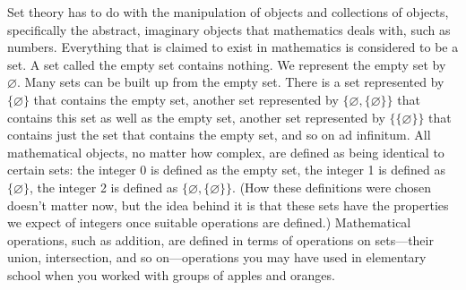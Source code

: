 Set theory has to do with the manipulation of objects and
collections of objects, specifically the abstract, imaginary objects that
mathematics deals with, such as numbers. Everything that is claimed to exist
in mathematics is considered to be a set.  A set called the empty
set contains nothing.  We represent the empty set by
$\varnothing$.  Many sets can be built up from the empty set.  There is a set
represented by $\{\varnothing\}$ that contains the empty set, another set
represented by $\{\varnothing,\{\varnothing\}\}$ that contains this set as
well as the empty set, another set represented by $\{\{\varnothing\}\}$ that
contains just the set that contains the empty set, and so on ad infinitum. All
mathematical objects, no matter how complex, are defined as being identical to
certain sets: the integer 0 is defined as the empty set, the
integer 1 is defined as $\{\varnothing\}$, the integer 2 is defined as
$\{\varnothing,\{\varnothing\}\}$.  (How these definitions were chosen doesn't
matter now, but the idea behind it is that these sets have the properties we
expect of integers once suitable operations are defined.)  Mathematical
operations, such as addition, are defined in terms of operations on
sets---their union, intersection, and
so on---operations you may have used in elementary school when you worked
with groups of apples and oranges.

